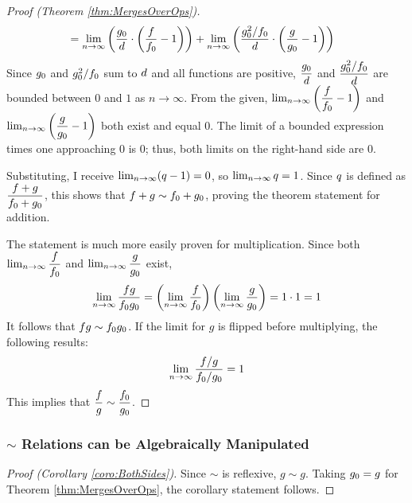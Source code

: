 \begin{proof}[Proof (Theorem \ref{thm:MergesOverOps})]
\begin{align*}
	&= \lim_{n \to \infty} \left( \frac{g_0}{d} \cdot \left( \frac{f}{f_0} - 1 \right) \right) + \lim_{n \to \infty} \left( \frac{g_0^2 / f_0}{d} \cdot \left( \frac{g}{g_0} - 1 \right) \right)
	\end{align*}
	Since $g_0$ and $g_0^2 / f_0$ sum to $d$ and all functions are positive, $\dfrac{g_0}{d}$ and $\dfrac{g_0^2 / f_0}{d}$ are bounded between $0$ and $1$ as $n \to \infty$. From the given, $\lim_{n \to \infty} \left( \dfrac{f}{f_0} - 1 \right)$ and $\lim_{n \to \infty} \left( \dfrac{g}{g_0} - 1 \right)$ both exist and equal $0$. The limit of a bounded expression times one approaching $0$ is $0$; thus, both limits on the right-hand side are $0$.
	
	Substituting, I receive $\lim_{n \to \infty} (q - 1) = 0$, so $\lim_{n \to \infty} q = 1$. Since $q$ is defined as $\dfrac{f + g}{f_0 + g_0}$, this shows that $f + g \sim f_0 + g_0$, proving the theorem statement for addition.
	
	The statement is much more easily proven for multiplication. Since both $\lim_{n \to \infty} \dfrac{f}{f_0}$ and $\lim_{n \to \infty} \dfrac{g}{g_0}$ exist,
	\begin{align*}
	\lim_{n \to \infty} \frac{fg}{f_0g_0} = \left( \lim_{n \to \infty} \frac{f}{f_0} \right) \left( \lim_{n \to \infty} \frac{g}{g_0} \right) = 1 \cdot 1 = 1
	\end{align*}
	It follows that $fg \sim f_0g_0$. If the limit for $g$ is flipped before multiplying, the following results:
	\begin{align*}
	\lim_{n \to \infty} \frac{f / g}{f_0 / g_0} = 1
	\end{align*}
	This implies that $\dfrac f g \sim \dfrac {f_0} {g_0}$.
\end{proof}

\subsubsection{$\sim$ Relations can be Algebraically Manipulated}

\begin{proof}[Proof (Corollary \ref{coro:BothSides})]
	Since $\sim$ is reflexive, $g \sim g$. Taking $g_0 = g$ for Theorem \ref{thm:MergesOverOps}, the corollary statement follows.
\end{proof}

